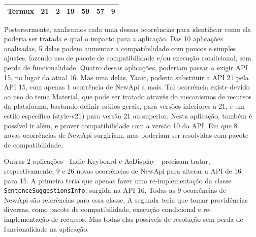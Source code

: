 \begin{table}[!htbp]
\begin{tabular}{|l|r|r|r|r|r|r|}
Termux                                                                   & 21                                                                                 & 2                                                                                             & 19                                                                                 & 59                                                                                            & 57                                                                                       & 9                                                                                           \\ \hline
\end{tabular}
\end{table}

Posteriormente, analisamos cada uma dessas ocorrências para identificar como ela
poderia ser tratada e qual o impacto para a aplicação. Das 10 aplicações analisadas,
5 delas podem aumentar a compatibilidade com poucos e simples ajustes, fazendo uso
de pacote de compatibilidade e/ou execução condicional, sem perda de funcionalidade.
Quatro dessas aplicações, poderiam passar a exigir API 15, no lugar da atual 16. Mas
uma delas, Yaaic, poderia substituir a API 21 pela API 15, com apenas 1 ocorrência de
NewApi a mais. Tal ocorrência existe devido ao uso do tema Material\cite{Material}, que pode ser tratado através do mecanismos de recursos da plataforma, bastando definir estilos gerais, para versões inferiores a 21, e um estilo específico (style-v21) para versão 21 ou superior. Nesta aplicação, também é possível ir além, e prover compatibilidade com a versão 10 da API. Em que 8 novas ocorrências de NewApi surgiriam, mas poderiam ser resolvidas com pacote de compatibilidade.

Outras 2 aplicações - Indic Keyboard e AcDisplay - precisam tratar, respectivamente,
9 e 26 novas ocorrências de NewApi para alterar a API de 16 para 15. A primeira teria
que apenas fazer uma re-implementação da classe \texttt{SentenceSuggestionsInfo},
surgida na API 16. Todas as 9 ocorrências de NewApi são referências para essa classe.
A segunda teria que tomar providências diversas, como pacote de compatibilidade, execução
condicional e re-implementação de recursos. Mas todas elas possíveis de resolução sem perda
de funcionalidade na aplicação.

